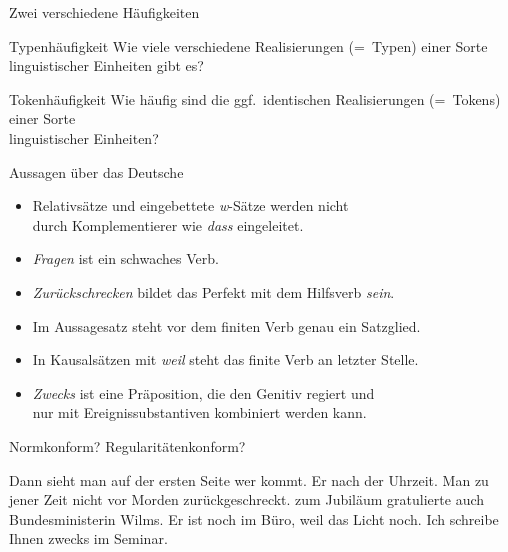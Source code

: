\begin{frame}
  {Zwei verschiedene Häufigkeiten}
  \onslide<+->
  \onslide<+->
  \begin{block}{Typenhäufigkeit}
    Wie viele \alert{verschiedene} Realisierungen (=~Typen) einer Sorte\\
    linguistischer Einheiten gibt es?
  \end{block}

  \onslide<+->
  \Zeile
  
  \begin{block}{Tokenhäufigkeit}
    Wie häufig sind die \alert{ggf.\ identischen} Realisierungen (=~Tokens) einer Sorte\\
    linguistischer Einheiten?
  \end{block}
\end{frame}

\begin{frame}
  {Aussagen über das Deutsche}
  \onslide<+->
  \begin{itemize}[<+->]
    \item Relativsätze und eingebettete \textit{w}-Sätze werden nicht\\
      durch Komplementierer wie \textit{dass} eingeleitet.
      \Viertelzeile
    \item \textit{Fragen} ist ein schwaches Verb.
      \Viertelzeile
    \item \textit{Zurückschrecken} bildet das Perfekt mit dem Hilfsverb \textit{sein}.
      \Viertelzeile
    \item Im Aussagesatz steht vor dem finiten Verb genau ein Satzglied.
      \Viertelzeile
    \item In Kausalsätzen mit \textit{weil} steht das finite Verb an letzter Stelle.
      \Viertelzeile
    \item \textit{Zwecks} ist eine Präposition, die den Genitiv regiert und\\
      nur mit Ereignissubstantiven kombiniert werden kann.
  \end{itemize}
\end{frame}


\begin{frame}
  {Normkonform? Regularitätenkonform?}
  \onslide<+->
  \onslide<+->
  \begin{exe}
    \ex
    \begin{xlist}
      \ex Dann sieht man auf der ersten Seite \alert{wer}  kommt.
      \onslide<+->
      \Halbzeile
      \ex Er  nach der Uhrzeit.
      \onslide<+->
      \Halbzeile
      \ex Man  zu jener Zeit nicht vor Morden \alert{zurückgeschreckt}.
      \onslide<+->
      \Halbzeile
      \ex {} \alert{zum Jubiläum} gratulierte auch Bundesministerin Wilms.
      \onslide<+->
      \Halbzeile
      \ex Er ist noch im Büro, \alert{weil} das Licht  noch.
      \onslide<+->
      \Halbzeile
      \ex Ich schreibe Ihnen \alert{zwecks}  im Seminar.
    \end{xlist}
  \end{exe}
\end{frame}



